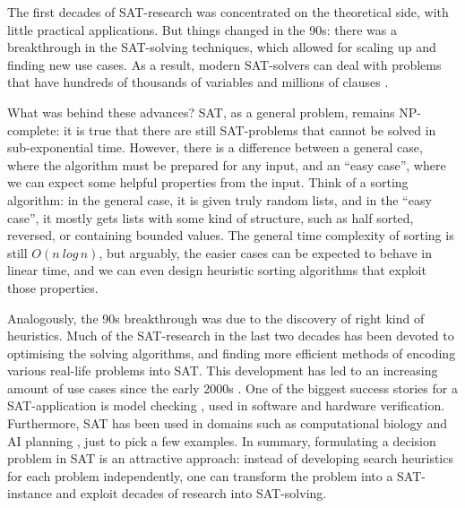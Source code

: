 
The first decades of SAT-research was concentrated on the theoretical side, with little practical applications.
But things changed in the 90s: there was a breakthrough in the SAT-solving techniques, 
which allowed for scaling up and finding new use cases. As a result, modern SAT-solvers can deal with problems that have hundreds of thousands of variables and millions of clauses \cite{marques_silva2010}.

What was behind these advances? SAT, as a general problem, remains NP-complete: 
it is true that there are still SAT-problems that cannot be solved in sub-exponential time.
However, there is a difference between a general case, where the algorithm must be prepared for any input, and an ``easy case'', where we can expect some helpful properties from the input.
Think of a sorting algorithm: in the general case, it is given truly random lists, and in the ``easy case'', it mostly gets lists with some kind of structure, such as half sorted, reversed, or containing bounded values. The general time complexity of sorting is still $O(n\ log\, n)$, but arguably, the easier cases can be expected to behave in linear time, and we can even design heuristic sorting algorithms that exploit those properties.

Analogously, the 90s breakthrough was due to the discovery of right kind of heuristics.
Much of the SAT-research in the last two decades has been devoted to optimising the solving algorithms, and finding more efficient methods of encoding various real-life problems into SAT.
This development has led to an increasing amount of use cases since the early 2000s \cite{claessen2009satpractice}.
One of the biggest success stories for a SAT-application is model checking \cite{sheeran1998modelchecking,biere1999modelchecking,bradley2011modelchecking}, used in software and hardware verification. Furthermore, SAT has been used in domains such as computational biology \cite{claessen2013compbioSAT} and AI planning \cite{selman_kautz92aiplanning}, just to pick a few examples.
In summary, formulating a decision problem in SAT is an attractive approach: instead of developing search heuristics for each problem independently, one can transform the problem into a SAT-instance and exploit decades of research into SAT-solving. 

